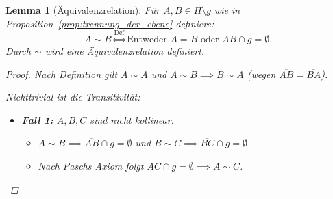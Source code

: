 \documentclass[a4paper,12pt]{article}
\theoremstyle{break}
\newtheorem{lemma}[definition]{Lemma}
\begin{document}
\begin{lemma}[Äquivalenzrelation]\label{lemma:äquivalenzrelation}
Für \(A, B \in \Pi \setminus g\) wie in Proposition~\ref{prop:trennung_der_ebene} definiere:
\[
A \sim B \stackrel{\text{Def}}{\iff} \text{Entweder } A = B \text{ oder } \overline{AB} \cap g = \emptyset.
\]
Durch \(\sim\) wird eine Äquivalenzrelation definiert.

\begin{proof} Nach Definition gilt \(A \sim A\) und \(A \sim B \implies B \sim A\) (wegen \(\overline{AB} = \overline{BA}\)).

Nichttrivial ist die Transitivität:

\begin{itemize}
    \item \textbf{Fall 1:} \(A, B, C\) sind nicht kollinear.
    \begin{itemize}
        \item \(A \sim B \implies \overline{AB} \cap g = \emptyset\) und \(B \sim C \implies \overline{BC} \cap g = \emptyset\).
        \item Nach Paschs Axiom folgt \(\overline{AC} \cap g = \emptyset \implies A \sim C\).
    \end{itemize}
    

\end{itemize}
\end{proof}
\end{lemma}
\end{document}
